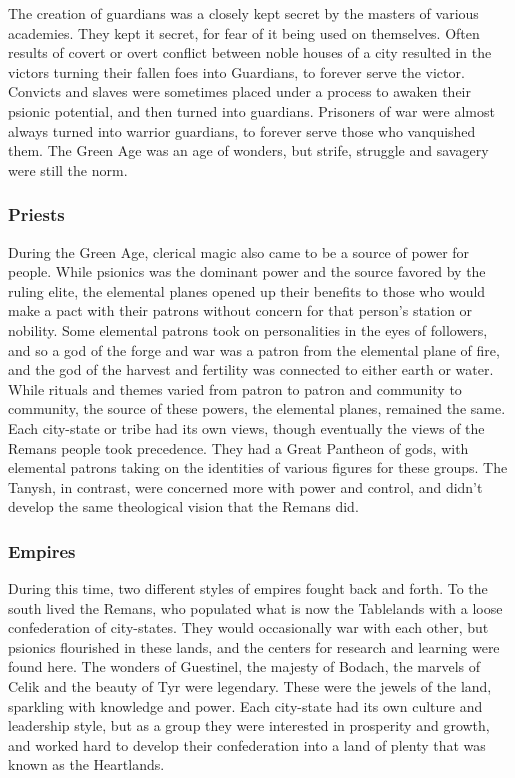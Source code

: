The creation of guardians was a closely kept secret by the masters of various academies. They kept it secret, for fear of it being used on themselves. Often results of covert or overt conflict between noble houses of a city resulted in the victors turning their fallen foes into Guardians, to forever serve the victor. Convicts and slaves were sometimes placed under a process to awaken their psionic potential, and then turned into guardians. Prisoners of war were almost always turned into warrior guardians, to forever serve those who vanquished them. The Green Age was an age of wonders, but strife, struggle and savagery were still the norm.

\subsubsection{Priests}
During the Green Age, clerical magic also came to be a source of power for people. While psionics was the dominant power and the source favored by the ruling elite, the elemental planes opened up their benefits to those who would make a pact with their patrons without concern for that person's station or nobility. Some elemental patrons took on personalities in the eyes of followers, and so a god of the forge and war was a patron from the elemental plane of fire, and the god of the harvest and fertility was connected to either earth or water. While rituals and themes varied from patron to patron and community to community, the source of these powers, the elemental planes, remained the same. Each city-state or tribe had its own views, though eventually the views of the Remans people took precedence. They had a Great Pantheon of gods, with elemental patrons taking on the identities of various figures for these groups. The Tanysh, in contrast, were concerned more with power and control, and didn't develop the same theological vision that the Remans did.

\subsubsection{Empires}
During this time, two different styles of empires fought back and forth. To the south lived the Remans, who populated what is now the Tablelands with a loose confederation of city-states. They would occasionally war with each other, but psionics flourished in these lands, and the centers for research and learning were found here. The wonders of Guestinel, the majesty of Bodach, the marvels of Celik and the beauty of Tyr were legendary. These were the jewels of the land, sparkling with knowledge and power. Each city-state had its own culture and leadership style, but as a group they were interested in prosperity and growth, and worked hard to develop their confederation into a land of plenty that was known as the Heartlands.

